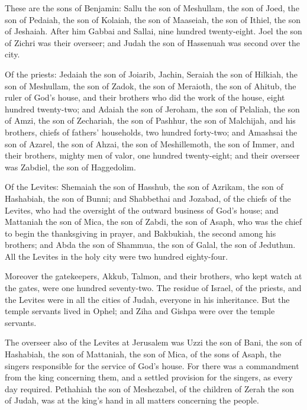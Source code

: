 \myverse{}These are the sons of Benjamin: Sallu the son of Meshullam, the
son of Joed, the son of Pedaiah, the son of Kolaiah, the son of Maaseiah, the son of Ithiel, the son of
Jeshaiah.
\myverse{}After him Gabbai and Sallai, nine hundred twenty-eight.
\myverse{}Joel the son of Zichri was their overseer; and Judah the son of Hassenuah was
second over the city.

\myverse{}Of the priests: Jedaiah the son of Joiarib, Jachin,
\myverse{}Seraiah the son of Hilkiah, the son of Meshullam, the son of Zadok, the son
of Meraioth, the son of Ahitub, the ruler of God’s house,
\myverse{}and their brothers who did the work of the house, eight hundred twenty-two;
and Adaiah the son of Jeroham, the son of Pelaliah, the son of Amzi, the son of Zechariah, the son of
Pashhur, the son of Malchijah,
\myverse{}and his brothers, chiefs of fathers’ households, two hundred forty-two; and
Amashsai the son of Azarel, the son of Ahzai, the son of Meshillemoth, the son of Immer,
\myverse{}and their brothers, mighty men of valor, one hundred twenty-eight; and their
overseer was Zabdiel, the son of Haggedolim.

\myverse{}Of the Levites: Shemaiah the son of Hasshub, the son of Azrikam,
the son of Hashabiah, the son of Bunni;
\myverse{}and Shabbethai and Jozabad, of the chiefs of the Levites, who had the oversight
of the outward business of God’s house;
\myverse{}and Mattaniah the son of Mica, the son of Zabdi, the son of Asaph, who was
the chief to begin the thanksgiving in prayer, and Bakbukiah, the second among his brothers; and Abda
the son of Shammua, the son of Galal, the son of Jeduthun.
\myverse{}All the Levites in the holy city were two hundred eighty-four.

\myverse{}Moreover the gatekeepers, Akkub, Talmon, and their brothers,
who kept watch at the gates, were one hundred seventy-two.
\myverse{}The residue of Israel, of the priests, and the Levites were in all the cities
of Judah, everyone in his inheritance.
\myverse{}But the temple servants lived in Ophel; and Ziha and Gishpa were over the
temple servants.

\myverse{}The overseer also of the Levites at Jerusalem was Uzzi the son
of Bani, the son of Hashabiah, the son of Mattaniah, the son of Mica, of the sons of Asaph, the singers
responsible for the service of God’s house.
\myverse{}For there was a commandment from the king concerning them, and a settled
provision for the singers, as every day required.
\myverse{}Pethahiah the son of Meshezabel, of the children of Zerah the son of Judah,
was at the king’s hand in all matters concerning the people.

